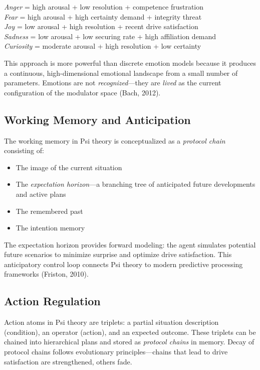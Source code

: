 \documentclass[11pt,letterpaper]{article}
\begin{document}
\begin{insightbox}
  \textit{Anger} = high arousal + low resolution + competence frustration\\
  \textit{Fear} = high arousal + high certainty demand + integrity threat\\
  \textit{Joy} = low arousal + high resolution + recent drive satisfaction\\
  \textit{Sadness} = low arousal + low securing rate + high affiliation demand\\
  \textit{Curiosity} = moderate arousal + high resolution + low certainty
\end{insightbox}

This approach is more powerful than discrete emotion models because it
produces a continuous, high-dimensional emotional landscape from a small
number of parameters. Emotions are not \emph{recognized}---they are
\emph{lived} as the current configuration of the modulator space
(Bach, 2012).

\subsection{Working Memory and Anticipation}

The working memory in Psi theory is conceptualized as a \emph{protocol
chain} consisting of:
\begin{itemize}
  \item The image of the current situation
  \item The \emph{expectation horizon}---a branching tree of anticipated
    future developments and active plans
  \item The remembered past
  \item The intention memory
\end{itemize}

The expectation horizon provides forward modeling: the agent simulates
potential future scenarios to minimize surprise and optimize drive
satisfaction. This anticipatory control loop connects Psi theory to modern
predictive processing frameworks (Friston, 2010).

\subsection{Action Regulation}

Action atoms in Psi theory are triplets: a partial situation description
(condition), an operator (action), and an expected outcome. These triplets
can be chained into hierarchical plans and stored as \emph{protocol chains}
in memory. Decay of protocol chains follows evolutionary principles---chains
that lead to drive satisfaction are strengthened, others fade.
\end{document}
